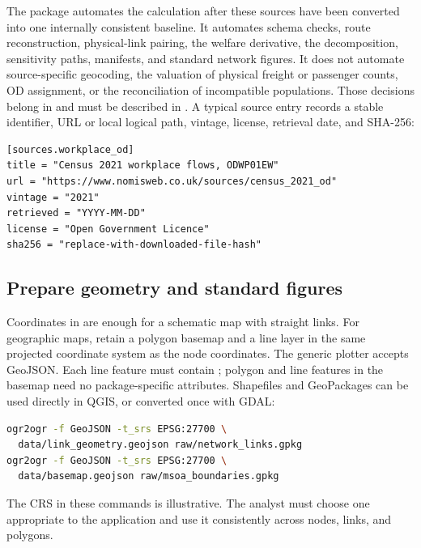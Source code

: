 The package automates the calculation after these sources have been converted
into one internally consistent baseline. It automates schema checks, route
reconstruction, physical-link pairing, the welfare derivative, the
decomposition, sensitivity paths, manifests, and standard network figures. It
does not automate source-specific geocoding, the valuation of physical freight
or passenger counts, OD assignment, or the reconciliation of incompatible
populations. Those decisions belong in  and
must be described in . A typical source entry records a
stable identifier, URL or local logical path, vintage, license, retrieval date,
and SHA-256:
\begin{lstlisting}
[sources.workplace_od]
title = "Census 2021 workplace flows, ODWP01EW"
url = "https://www.nomisweb.co.uk/sources/census_2021_od"
vintage = "2021"
retrieved = "YYYY-MM-DD"
license = "Open Government Licence"
sha256 = "replace-with-downloaded-file-hash"
\end{lstlisting}

\subsection{Prepare geometry and standard figures}
\label{sec:own-data-maps}

Coordinates in  are enough for a schematic map with straight
links. For geographic maps, retain a polygon basemap and a line layer in the
same projected coordinate system as the node coordinates. The generic plotter
accepts GeoJSON. Each line feature must contain
; polygon and line features in the basemap need no
package-specific attributes. Shapefiles and GeoPackages can be used directly
in QGIS, or converted once with GDAL:
\begin{lstlisting}[language=bash]
ogr2ogr -f GeoJSON -t_srs EPSG:27700 \
  data/link_geometry.geojson raw/network_links.gpkg
ogr2ogr -f GeoJSON -t_srs EPSG:27700 \
  data/basemap.geojson raw/msoa_boundaries.gpkg
\end{lstlisting}
The CRS in these commands is illustrative. The analyst must choose one
appropriate to the application and use it consistently across nodes, links,
and polygons.


